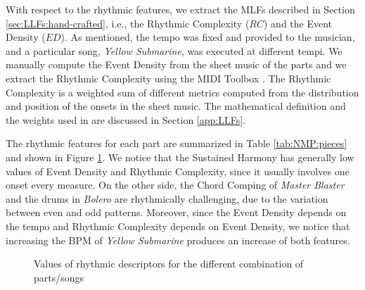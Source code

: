 With respect to the rhythmic features, we extract the MLFs described in Section \ref{sec:LLFs:hand-crafted}, i.e., the Rhythmic Complexity ($RC$) and the Event Density ($ED$). As mentioned, the tempo was fixed and provided to the musician, and a particular song, \textit{Yellow Submarine}, was executed at different tempi. We manually compute the Event Density \cite{Lartillot2007} from the sheet music of the parts and we extract the Rhythmic Complexity \cite{povel} using the MIDI Toolbox \cite{Eerola2004}. The Rhythmic Complexity is a weighted sum of different metrics computed from the distribution and position of the onsets in the sheet music. The mathematical definition and the weights used in \cite{Eerola2004} are discussed in Section \ref{app:LLFs}. 

The rhythmic features for each part are summarized in Table 
\ref{tab:NMP:pieces} and shown in Figure \ref{fig:NMP:values_rhythm}. We notice that the Sustained Harmony has generally low values of Event Density and Rhythmic Complexity, since it usually involves one onset every measure. On the other side, the Chord Comping of \textit{Master Blaster} and the drums in \textit{Bolero} are rhythmically challenging, due to the variation between even and odd patterns. Moreover, since the Event Density depends on the tempo and Rhythmic Complexity depends on Event Density, we notice that increasing the BPM of \textit{Yellow Submarine} produces an increase of both features.


\begin{figure}[!tb]
	  \hfil
	  \hfil
	
	\caption{Values of rhythmic descriptors for the different combination of parts/songs}
	\label{fig:NMP:values_rhythm}
\end{figure}




